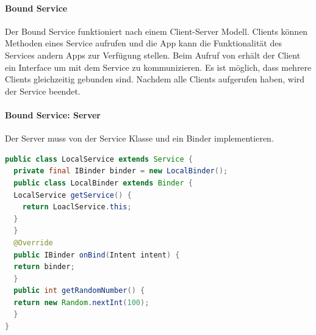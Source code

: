 \paragraph{Bound Service} Der Bound Service funktioniert nach einem Client-Server Modell. Clients können Methoden eines Service aufrufen und die App kann die Funktionalität des Services andern Apps zur Verfügung stellen. Beim Aufruf von  erhält der Client ein Interface um mit dem Service zu kommunizieren. Es ist möglich, dass mehrere Clients gleichzeitig gebunden sind. Nachdem alle Clients  aufgerufen haben, wird der Service beendet.

\paragraph{Bound Service: Server} Der Server muss von der Service Klasse und ein Binder implementieren.
\begin{lstlisting}[language=java]
public class LocalService extends Service {
  private final IBinder binder = new LocalBinder();
  public class LocalBinder extends Binder {
  LocalService getService() {
    return LoaclService.this;
  }
  }
  @Override
  public IBinder onBind(Intent intent) {
  return binder;
  }
  public int getRandomNumber() {
  return new Random.nextInt(100);
  }
}
\end{lstlisting}



